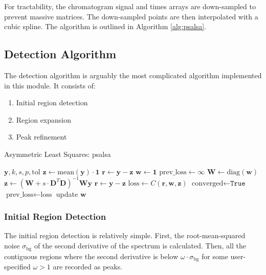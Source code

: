 \documentclass{article}
\begin{document}
For tractability, the chromatogram signal and times arrays are down-sampled to prevent massive matrices. The down-sampled points are then interpolated with a cubic spline. The algorithm is outlined in Algorithm \ref{alg:psalsa}.

\subsection{Detection Algorithm}\label{sec:detectionalg}
The detection algorithm is arguably the most complicated algorithm implemented in this module. It consists of:
\begin{enumerate}
\item Initial region detection
\item Region expansion
\item Peak refinement
\end{enumerate}

\begin{algorithm}[ht]
\caption{Asymmetric Least Squares: psalsa}\label{alg:psalsa}
\begin{algorithmic}
\Require $ \mathbf{y}, k, s, p, \text{tol}$
\State $\mathbf{z} \gets \text{mean}(\mathbf{y}) \cdot \mathbf{1}$
\State $\mathbf{r} \gets \mathbf{y} - \mathbf{z}$
\State $\mathbf{w} \gets \mathbf{1}$ 
\State $\text{prev\_loss} \gets \infty$
\State $\mathbf{W} \gets \text{diag}(\mathbf{w})$ 
\State $\mathbf{z} \gets (\mathbf{W} + s \cdot \mathbf{D}^T\mathbf{D})^{-1}\mathbf{W}\mathbf{y}$ 
\State $\mathbf{r} \gets \mathbf{y} - \mathbf{z}$ 
\State $\text{loss} \gets C(\mathbf{r},\mathbf{w},\mathbf{z})$ 
 
    \State $\text{converged} \gets \texttt{True}$
\EndIf
\State $\text{prev\_loss} \gets \text{loss}$
\State update $\mathbf{w}$ 
\EndWhile
\end{algorithmic}
\end{algorithm}

\subsubsection{Initial Region Detection}
The initial region detection is relatively simple. First, the root-mean-squared noise $\sigma_{\text{bg}}$ of the second derivative of the spectrum is calculated. Then, all the contiguous regions where the second derivative is below $\omega \cdot \sigma_{\text{bg}}$ for some user-specified $\omega >1$ are recorded as peaks. 
\end{document}

